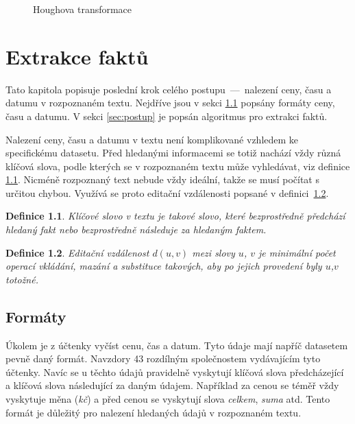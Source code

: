\documentclass[thesis=B,czech]{FITthesis}[2019/12/23]
\newtheorem{defn}{Definice}[section]
\begin{document}
\begin{figure}[p]%
	\centering
	\hspace{1pt}
	\hspace{1pt}
	\caption{Houghova transformace}%
	\label{fig:hough-transformation}%
\end{figure}

\chapter{Extrakce faktů}
\label{chapter:extrakce-faktu}
Tato kapitola popisuje poslední krok celého postupu~—~nalezení ceny, času a datumu v rozpoznaném textu. Nejdříve jsou v sekci \ref{sec:formaty} popsány formáty ceny, času a datumu. V sekci \ref{sec:postup} je popsán algoritmus pro extrakci faktů.

Nalezení ceny, času a datumu v textu není komplikované vzhledem ke specifickému datasetu. Před hledanými informacemi se totiž nachází vždy různá klíčová slova, podle kterých se v rozpoznaném textu může vyhledávat, viz definice \ref{def:keyword}. Nicméně rozpoznaný text nebude vždy ideální, takže se musí počítat s určitou chybou. Využívá se proto editační vzdálenosti popsané v definici~\ref{def:edit-distance}.

\begin{defn}Klíčové slovo v textu je takové slovo, které bezprostředně předchází hledaný fakt nebo bezprostředně následuje za hledaným faktem.\label{def:keyword}\end{defn}

\begin{defn}Editační vzdálenost $d(u,v)$ mezi slovy $u$, $v$ je minimální počet operací vkládání, mazání a substituce takových, aby po jejich provedení byly $u$,$v$ totožné.\label{def:edit-distance}\end{defn}

\section{Formáty}
\label{sec:formaty}
Úkolem je z účtenky vyčíst cenu, čas a datum. Tyto údaje mají napříč datasetem pevně daný formát. Navzdory 43 rozdílným společnostem vydávajícím tyto účtenky. Navíc se u těchto údajů pravidelně vyskytují klíčová slova předcházející a klíčová slova následující za daným údajem. Například za cenou se téměř vždy vyskytuje měna (\textit{kč}) a před cenou se vyskytují slova \textit{celkem}, \textit{suma} atd. Tento formát je důležitý pro nalezení hledaných údajů v rozpoznaném textu.
\end{document}
